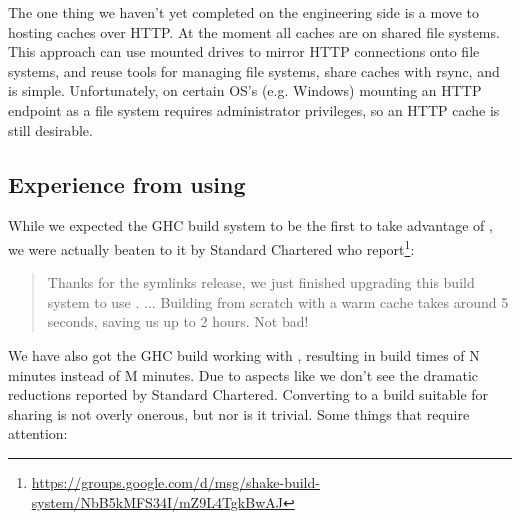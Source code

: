{The one thing we haven't yet completed on the engineering side is a move to hosting caches over HTTP. At the moment all caches are on shared file systems. This approach can use mounted drives to mirror HTTP connections onto file systems, and reuse tools for managing file systems, share caches with rsync, and is simple. Unfortunately, on certain OS's (e.g. Windows) mounting an HTTP endpoint as a file system requires administrator privileges, so an HTTP cache is still desirable.

\subsection{Experience from using \Cloud \Shake}\label{sec-using-cloud-shake}

While we expected the GHC build system to be the first to take advantage of \Cloud \Shake, we were actually beaten to it by Standard Chartered who report\footnote{\url{https://groups.google.com/d/msg/shake-build-system/NbB5kMFS34I/mZ9L4TgkBwAJ}}:

\begin{quote}
Thanks for the symlinks release, we just finished upgrading this build system to use . ...
Building from scratch with a warm cache takes around 5 seconds, saving us up to 2 hours. Not bad!
\end{quote}

We have also got the GHC build working with \Cloud \Shake, resulting in build times of N minutes instead of M minutes. Due to aspects like  we don't see the dramatic reductions reported by Standard Chartered. Converting to a build suitable for sharing is not overly onerous, but nor is it trivial. Some things that require attention:

}
